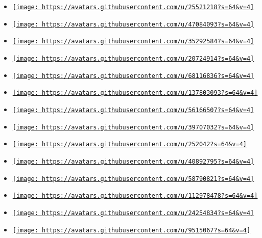 \begin{itemize}
\item
  \href{https://github.com/Enter-tainer}{\texttt{[image: https://avatars.githubusercontent.com/u/25521218?s=64\&v=4]}}
\item
  \href{https://github.com/LaurenzV}{\texttt{[image: https://avatars.githubusercontent.com/u/47084093?s=64\&v=4]}}
\item
  \href{https://github.com/Myriad-Dreamin}{\texttt{[image: https://avatars.githubusercontent.com/u/35292584?s=64\&v=4]}}
\item
  \href{https://github.com/rikhuijzer}{\texttt{[image: https://avatars.githubusercontent.com/u/20724914?s=64\&v=4]}}
\item
  \href{https://github.com/ssotoen}{\texttt{[image: https://avatars.githubusercontent.com/u/68116836?s=64\&v=4]}}
\item
  \href{https://github.com/tingerrr}{\texttt{[image: https://avatars.githubusercontent.com/u/137803093?s=64\&v=4]}}
\item
  \href{https://github.com/FlorentCLMichel}{\texttt{[image: https://avatars.githubusercontent.com/u/56166507?s=64\&v=4]}}
\item
  \href{https://github.com/T0mstone}{\texttt{[image: https://avatars.githubusercontent.com/u/39707032?s=64\&v=4]}}
\item
  \href{https://github.com/drupol}{\texttt{[image: https://avatars.githubusercontent.com/u/252042?s=64\&v=4]}}
\item
  \href{https://github.com/emilyyyylime}{\texttt{[image: https://avatars.githubusercontent.com/u/40892795?s=64\&v=4]}}
\item
  \href{https://github.com/A-Walrus}{\texttt{[image: https://avatars.githubusercontent.com/u/58790821?s=64\&v=4]}}
\item
  \href{https://github.com/LuizAugustoPapa}{\texttt{[image: https://avatars.githubusercontent.com/u/112978478?s=64\&v=4]}}
\item
  \href{https://github.com/PepinhoJp}{\texttt{[image: https://avatars.githubusercontent.com/u/24254834?s=64\&v=4]}}
\item
  \href{https://github.com/freundTech}{\texttt{[image: https://avatars.githubusercontent.com/u/9515067?s=64\&v=4]}}

\end{itemize}
